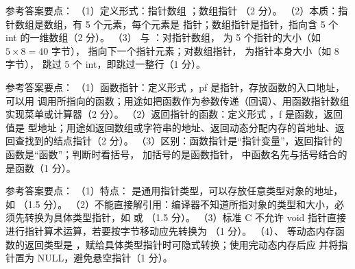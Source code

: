 \documentclass[a4paper,11pt]{article}
\begin{document}

\q 参考答案要点：
（1）定义形式：指针数组 ；数组指针 （2 分）。
（2）本质：指针数组是数组，有 5 个元素，每个元素是  指针；数组指针是指针，指向含 5 个 int 的一维数组（2 分）。
（3） 与 ：对指针数组， 为 5 个指针的大小（如 $5\times8=40$ 字节）， 指向下一个指针元素；对数组指针， 为指针本身大小（如 8 字节）， 跳过 5 个 int，即跳过一整行（1 分）。

\q 参考答案要点：
（1）函数指针：定义形式 ，pf 是指针，存放函数的入口地址，可以用  调用所指向的函数；用途如把函数作为参数传递（回调）、用函数指针数组实现菜单或计算器（2 分）。
（2）返回指针的函数：定义形式 ，f 是函数，返回值是  型地址；用途如返回数组或字符串的地址、返回动态分配内存的首地址、返回查找到的结点指针（2 分）。
（3）区别：函数指针是“指针变量”，返回指针的函数是“函数”；判断时看括号， 加括号的是函数指针， 中函数名先与括号结合的是函数（1 分）。

\q 参考答案要点：
（1）特点： 是通用指针类型，可以存放任意类型对象的地址，如 （1.5 分）。
（2）不能直接解引用：编译器不知道所指对象的类型和大小，必须先转换为具体类型指针，如  或 （1.5 分）。
（3）标准 C 不允许 void 指针直接进行指针算术运算，若要按字节移动应先转换为 （1 分）。
（4）、 等动态内存函数的返回类型是 ，赋给具体类型指针时可隐式转换；使用完动态内存后应  并将指针置为 NULL，避免悬空指针（1 分）。

\end{document}
